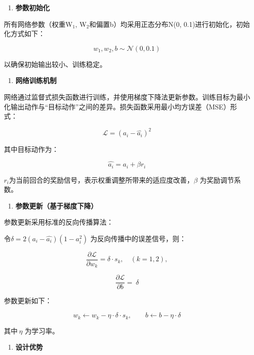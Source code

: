 \documentclass[12pt]{ctexart}
\begin{document}
\begin{enumerate}
\def\labelenumi{\alph{enumi})}
\setcounter{enumi}{2}
\item
  \textbf{参数初始化}
\end{enumerate}

所有网络参数（权重W$_1$, W$_2$和偏置b）均采用正态分布N(0,
0.1)进行初始化，初始化方式如下：

\[w_{1},w_{2},b \sim \mathcal{N}(0,0.1)\]

以确保初始输出较小、训练稳定。

\begin{enumerate}
\def\labelenumi{\alph{enumi})}
\setcounter{enumi}{3}
\item
  \textbf{网络训练机制}
\end{enumerate}

网络通过监督式损失函数进行训练，并使用梯度下降法更新参数。训练目标为最小化输出动作与``目标动作''之间的差异。损失函数采用最小均方误差（MSE）形式：

\[\mathcal{L =}\left( a_{i} - \widehat{a_{i}} \right)^{2}\]

其中目标动作为：

\[\widehat{a_{i}} = a_{i} + \beta r_{i}\]

\(r_{i}\)为当前回合的奖励信号，表示权重调整所带来的适应度改善，\(\beta\)
为奖励调节系数。

\begin{enumerate}
\def\labelenumi{\alph{enumi})}
\setcounter{enumi}{4}
\item
  \textbf{参数更新（基于梯度下降）}
\end{enumerate}

参数更新采用标准的反向传播算法：

令\(\delta = 2\left( a_{i} - \widehat{a_{i}} \right)\left( 1 - a_{i}^{2} \right)\)
为反向传播中的误差信号，则：

\[\frac{\partial\mathcal{L}}{\partial w_{k}} = \delta \cdot s_{k},\quad(k = 1,2),\]

\[\frac{\partial\mathcal{L}}{\partial b} = \ \delta\]

参数更新如下：

\[w_{k} \leftarrow w_{k} - \eta \cdot \delta \cdot s_{k},\quad\quad b \leftarrow b - \eta \cdot \delta\]

其中\(\ \eta\) 为学习率。

\begin{enumerate}
\def\labelenumi{\alph{enumi})}
\setcounter{enumi}{5}
\item
  \textbf{设计优势}
\end{enumerate}
\end{document}
